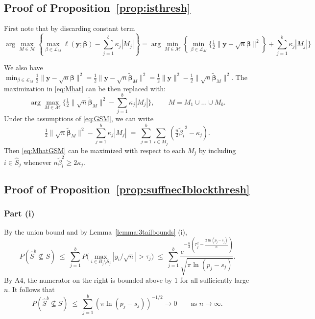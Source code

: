 \documentclass[aos]{imsart}
\theoremstyle{plain}
\newcommand{\M}{\mathcal{M}}
\newcommand{\bs}{\boldsymbol}
\begin{document}
 

\subsection{Proof of Proposition~\ref{prop:isthresh}}
First note that by discarding constant term 
 $$\arg\max_{M\in \M} \left\{\max_{\beta\in \mathcal{L}_M}\ell(\bs y; \bs \beta)-\sum_{j=1}^b\kappa_j |M_j| \right\}=\arg\min_{M\in \M} \left\{\min_{\beta\in \mathcal{L}_M}\bigg\{ \tfrac{1}{2}\|\bs y-\sqrt{n}\bs\beta\|^2\right\}+\sum_{j=1}^b\kappa_j |M_j| \bigg\}$$

 We also have $\min_{\beta\in \mathcal{L}_M} \tfrac{1}{2}\|\bs y-\sqrt{n}\bs\beta\|^2=\tfrac{1}{2}\|\bs y-\sqrt{n}\tilde{\bs \beta}_M\|^2=\tfrac{1}{2}\|\bs y\|^2-\tfrac{1}{2}\|\sqrt{n}\tilde{\bs \beta}_M\|^2$. The maximization in \eqref{eq:Mhat} can be then replaced with:
     \begin{equation}\label{eq:MhatGSM}
  \arg\max_{M\in \M} \bigg\{\tfrac{1}{2}\| \sqrt{n}\tilde{\bs \beta}_M\|^2-\sum_{j=1}^b\kappa_j |M_j|\bigg\}, \qquad M=M_1\cup \ldots\cup M_b.	
\end{equation}
Under the assumptions of \eqref{eq:GSM}, we can write 
	$$
	\tfrac{1}{2}\|\sqrt{n}\tilde{\bs \beta}_M\|^2-\sum_{j=1}^b\kappa_j |M_j|\;=\;\sum_{j=1}^b\sum_{i\in M_j}(\tfrac{n}{2}{\tilde{ \beta}_i}^2-\kappa_j).
	$$
	Then \eqref{eq:MhatGSM} can be maximized with respect to each $M_j$ by including $i\in \hat S_j$ whenever $n\tilde\beta_i^2\geq 2\kappa_j$.

\subsection{Proof of Proposition~\ref{prop:suffnecIblockthresh}} 

\subsubsection{Part (i)} 
By the union bound and by Lemma~\ref{lemma:3tailbounds} (i),
\begin{equation}\label{eq:type1convrate}
P\left(\hat{S}^{b} \not\subseteq S\right)\;\leq\; \sum_{j=1}^b P\Big(\max_{i\in B_j\setminus S_j}|y_i/\sqrt{n}|>\tau_{j}\Big)\;\leq\;\sum_{j=1}^b\frac{e^{-\tfrac{n}{2}\left(\tau_j^2-\tfrac{2\ln(p_j-s_j)}{n}\right)}}{\sqrt{\pi\ln(p_j-s_j)}} 	.
 \end{equation}
 By A4, the numerator on the right is bounded above by $1$ for all sufficiently large $n$. It follows that 
	$$P\left(\hat{S}^{b} \not\subseteq S\right) \;\leq\; \sum_{j=1}^b (\pi\ln (p_j-s_j))^{-1/2} \to 0\qquad \mbox{as } n\to \infty.$$
\end{document}
